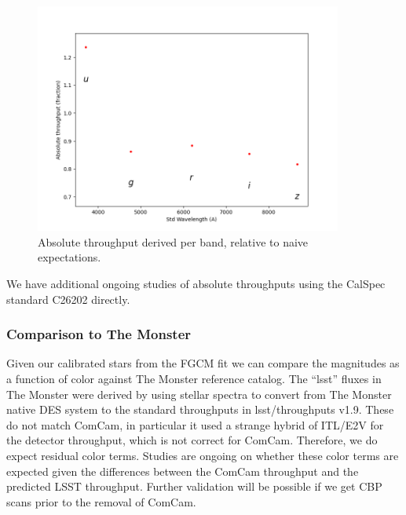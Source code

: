 \begin{figure}
  \begin{center}
    \includegraphics[width=0.9\textwidth]{photometric_calibration_figures/abs_throughput.png}
  \end{center}
  \caption{Absolute throughput derived per band, relative to naive expectations.}
  \label{fig:absthroughputs}
\end{figure}

We have additional ongoing studies of absolute throughputs using the CalSpec
standard C26202 directly.

\subsubsection{Comparison to The Monster}

Given our calibrated stars from the FGCM fit we can compare the magnitudes as a
function of color against The Monster reference catalog.  The ``lsst'' fluxes
in The Monster were derived by using stellar spectra to convert from The
Monster native DES system to the standard throughputs in lsst/throughputs
v1.9. These do not match ComCam, in particular it used a strange hybrid of
ITL/E2V for the detector throughput, which is not correct for
ComCam. Therefore, we do expect residual color terms.  Studies are ongoing on
whether these color terms are expected given the differences between the ComCam
throughput and the predicted LSST throughput.  Further validation will be
possible if we get CBP scans prior to the removal of ComCam.


